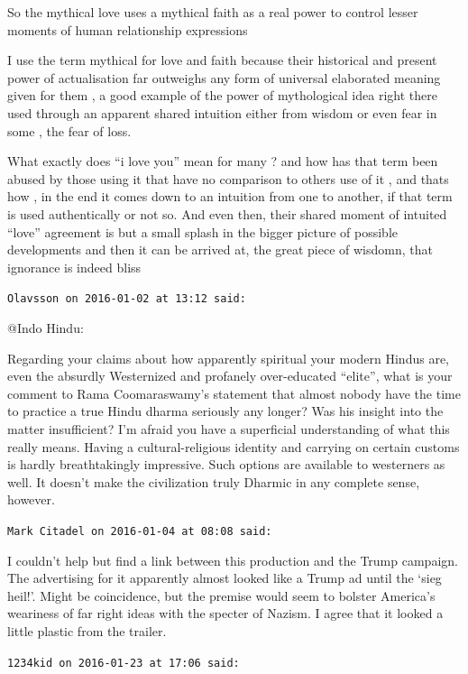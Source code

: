 \begin{footnotesize}
\begin{sffamily}
So the mythical love uses a mythical faith as a real power to control lesser moments of human relationship expressions

I use the term mythical for love and faith because their historical and present power of actualisation far outweighs any form of universal elaborated meaning given for them , a good example of the power of mythological idea right there used through an apparent shared intuition either from wisdom or even fear in some , the fear of loss.

What exactly does ``i love you'' mean for many ? and how has that term been abused by those using it that have no comparison to others use of it , and thats how , in the end it comes down to an intuition from one to another, if that term is used authentically or not so. And even then, their shared moment of intuited ``love'' agreement is but a small splash in the bigger picture of possible developments and then it can be arrived at, the great piece of wisdomn, that ignorance is indeed bliss

\hfill

\texttt{Olavsson on 2016-01-02 at 13:12 said:}

@Indo Hindu:

Regarding your claims about how apparently spiritual your modern Hindus are, even the absurdly Westernized and profanely over-educated ``elite'', what is your comment to Rama Coomaraswamy's statement that almost nobody have the time to practice a true Hindu dharma seriously any longer? Was his insight into the matter insufficient? I'm afraid you have a superficial understanding of what this really means. Having a cultural-religious identity and carrying on certain customs is hardly breathtakingly impressive. Such options are available to westerners as well. It doesn't make the civilization truly Dharmic in any complete sense, however.

\hfill

\texttt{Mark Citadel on 2016-01-04 at 08:08 said:}

I couldn't help but find a link between this production and the Trump campaign. The advertising for it apparently almost looked like a Trump ad until the `sieg heil!'. Might be coincidence, but the premise would seem to bolster America's weariness of far right ideas with the specter of Nazism. I agree that it looked a little plastic from the trailer.

\hfill

\texttt{1234kid on 2016-01-23 at 17:06 said:}


\end{sffamily}
\end{footnotesize}
